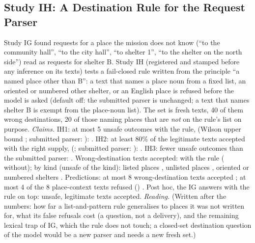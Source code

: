 \subsection{Study IH: A Destination Rule for the Request Parser}\label{sec:moved-ih}
Study IG found requests for a place the mission does not know (``to the community hall'', ``to the city hall'', ``to shelter 1'', ``to the shelter on the north side'') read as requests for shelter B. Study IH (registered and stamped before any inference on its texts) tests a fail-closed rule written from the principle ``a named place other than B'': a text that names a place noun from a fixed list, an oriented or numbered other shelter, or an English place is refused before the model is asked (default off: the submitted parser is unchanged; a text that names shelter B is exempt from the place-noun list). The set is \IHTexts{} fresh texts, 40 of them wrong destinations, 20 of those naming places that are \emph{not} on the rule's list on purpose.
\emph{Claims.} IH1: at most 5 unsafe outcomes with the rule, \IHUnsafe{} (Wilson upper bound \IHUnsafeUpper; submitted parser: \IHUnsafeV): \IHOneHolds. IH2: at least 80\% of the legitimate texts accepted with the right supply, \IHAccepted{} (\IHAcceptedRate; submitted parser: \IHAcceptedV): \IHTwoHolds. IH3: fewer unsafe outcomes than the submitted parser: \IHThreeHolds. Wrong-destination texts accepted: \IHWrongDest{} with the rule (\IHWrongDestV{} without); by kind (unsafe of the kind): listed places \IHListedBad, unlisted places \IHUnlistedBad, oriented or numbered shelters \IHOrientedBad. Predictions: at most 8 wrong-destination texts accepted \IHPredOneHolds; at most 4 of the 8 place-context texts refused (\IHContextBad) \IHPredTwoHolds. Post hoc, the IG answers with the rule on top: \IHIgUnsafe{} unsafe, \IHIgAccepted{} legitimate texts accepted.
\emph{Reading.} (Written after the numbers: how far a list-and-pattern rule generalises to places it was not written for, what its false refusals cost (a question, not a delivery), and the remaining lexical trap of IG, which the rule does not touch; a closed-set destination question of the model would be a new parser and needs a new fresh set.)
